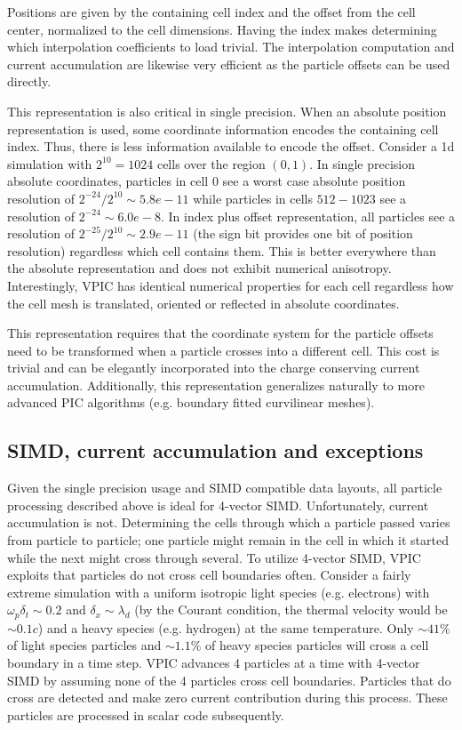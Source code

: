 \documentclass[letter,10pt]{article}
\begin{document}
Positions are given by the containing cell index and the offset from
the cell center, normalized to the cell dimensions.  Having the index
makes determining which interpolation coefficients to load trivial.
The interpolation computation and current accumulation are likewise
very efficient as the particle offsets can be used directly.

This representation is also critical in single precision.  When an
absolute position representation is used, some coordinate information
encodes the containing cell index.  Thus, there is less information
available to encode the offset.  Consider a 1d simulation with $2^{10}
= 1024$ cells over the region $(0,1)$.  In single precision absolute
coordinates, particles in cell $0$ see a worst case absolute position
resolution of $2^{-24}/2^{10} \sim 5.8e-11$ while particles in cells
$512-1023$ see a resolution of $2^{-24} \sim 6.0e-8$.  In index plus
offset representation, all particles see a resolution of
$2^{-25}/2^{10} \sim 2.9e-11$ (the sign bit provides one bit of
position resolution) regardless which cell contains them.  This is
better everywhere than the absolute representation and does not
exhibit numerical anisotropy.  Interestingly, VPIC has identical
numerical properties for each cell regardless how the cell mesh is
translated, oriented or reflected in absolute coordinates.

This representation requires that the coordinate system for the
particle offsets need to be transformed when a particle crosses into a
different cell.  This cost is trivial and can be elegantly
incorporated into the charge conserving current accumulation.
Additionally, this representation generalizes naturally to more
advanced PIC algorithms (e.g. boundary fitted curvilinear meshes).

\subsection{SIMD, current accumulation and exceptions}

Given the single precision usage and SIMD compatible data layouts, all
particle processing described above is ideal for 4-vector SIMD.
Unfortunately, current accumulation is not.  Determining the cells
through which a particle passed varies from particle to particle; one
particle might remain in the cell in which it started while the next
might cross through several.  To utilize 4-vector SIMD, VPIC exploits
that particles do not cross cell boundaries often.  Consider a fairly
extreme simulation with a uniform isotropic light species
(e.g. electrons) with $\omega_p \delta_t \sim 0.2$ and $\delta_x \sim
\lambda_d$ (by the Courant condition, the thermal velocity would be
$\sim 0.1c$) and a heavy species (e.g. hydrogen) at the same
temperature.  Only $\sim 41\%$ of light species particles and $\sim
1.1\%$ of heavy species particles will cross a cell boundary in a time
step.  VPIC advances 4 particles at a time with 4-vector SIMD by
assuming none of the 4 particles cross cell boundaries.  Particles
that do cross are detected and make zero current contribution during
this process.  These particles are processed in scalar code
subsequently.
\end{document}
